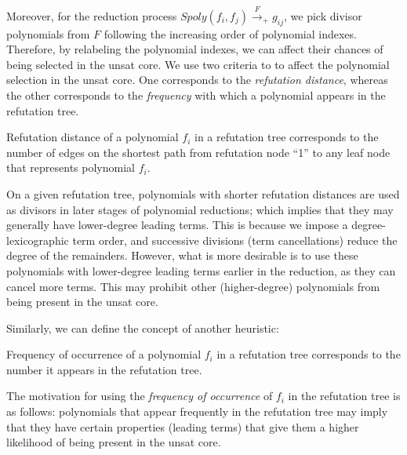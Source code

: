 Moreover, for the reduction process
$Spoly(f_i,f_j)\xrightarrow{F}_+g_{ij}$, we pick divisor polynomials from
$F$ following the increasing order of polynomial indexes. Therefore,
by relabeling the polynomial indexes, we can affect their
chances of being selected in the unsat core. We use two criteria to
to affect the polynomial selection in the unsat core. One corresponds
to the \emph{refutation distance}, whereas the other corresponds to
the {\it frequency} with which a polynomial appears in the refutation
tree.  

\begin{Definition}
Refutation distance of a polynomial $f_i$ in a refutation tree
corresponds to the number of edges on the shortest path from refutation
node ``1'' to any leaf node that represents polynomial $f_i$. 
\end{Definition}

On a given refutation tree, polynomials with shorter refutation
distances are used as divisors in later stages of polynomial
reductions; which implies that they may generally have lower-degree
leading terms. This is because we impose a degree-lexicographic term
order, and successive divisions (term cancellations) reduce the degree
of the remainders. However, what is more desirable is to use these
polynomials with lower-degree leading terms earlier in the reduction,
as they can cancel more terms. This may prohibit other (higher-degree)
polynomials from being present in the unsat core. 



Similarly, we can define the concept of another heuristic:
\begin{Definition}
Frequency of occurrence of a polynomial $f_i$ in a refutation tree
corresponds to the number it appears in the refutation tree. 
\end{Definition}

The motivation for using the \emph{frequency of occurrence}
of $f_i$ in the refutation tree is as follows: polynomials that appear
frequently in the refutation tree may imply that they have certain
properties (leading terms) that give them a higher likelihood of being
present in the unsat core. 

